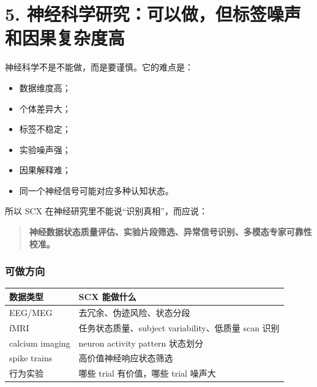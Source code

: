 \documentclass[
  12pt,
]{ctexart}
\providecommand{\tightlist}{%
  \setlength{\itemsep}{0pt}\setlength{\parskip}{0pt}}
\begin{document}
\section{5.
神经科学研究：可以做，但标签噪声和因果复杂度高}\label{ux795eux7ecfux79d1ux5b66ux7814ux7a76ux53efux4ee5ux505aux4f46ux6807ux7b7eux566aux58f0ux548cux56e0ux679cux590dux6742ux5ea6ux9ad8}

神经科学不是不能做，而是要谨慎。它的难点是：

\begin{itemize}
\tightlist
\item
  数据维度高；
\item
  个体差异大；
\item
  标签不稳定；
\item
  实验噪声强；
\item
  因果解释难；
\item
  同一个神经信号可能对应多种认知状态。
\end{itemize}

所以 SCX 在神经研究里不能说``识别真相''，而应说：

\begin{quote}
\textbf{神经数据状态质量评估、实验片段筛选、异常信号识别、多模态专家可靠性校准。}
\end{quote}

\subsubsection{可做方向}\label{ux53efux505aux65b9ux5411}

\begin{longtable}[]{@{}
  >{\raggedright\arraybackslash}p{}
  >{\raggedright\arraybackslash}p{}@{}}
\toprule\noalign{}
\begin{minipage}[b]{\linewidth}\raggedright
数据类型
\end{minipage} & \begin{minipage}[b]{\linewidth}\raggedright
SCX 能做什么
\end{minipage} \\
\midrule\noalign{}
\endhead
\bottomrule\noalign{}
\endlastfoot
EEG/MEG & 去冗余、伪迹风险、状态分段 \\
fMRI & 任务状态质量、subject variability、低质量 scan 识别 \\
calcium imaging & neuron activity pattern 状态划分 \\
spike trains & 高价值神经响应状态筛选 \\
行为实验 & 哪些 trial 有价值，哪些 trial 噪声大 \\
\end{longtable}
\end{document}
